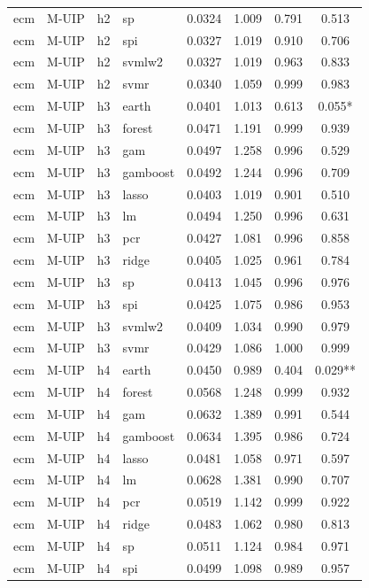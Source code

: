 \begin{ThreePartTable}
\begin{longtable}[t]{llclcccc}
ecm & M-UIP & h2 & sp & 0.0324 & 1.009 & 0.791 & 0.513\\
ecm & M-UIP & h2 & spi & 0.0327 & 1.019 & 0.910 & 0.706\\
ecm & M-UIP & h2 & svmlw2 & 0.0327 & 1.019 & 0.963 & 0.833\\
ecm & M-UIP & h2 & svmr & 0.0340 & 1.059 & 0.999 & 0.983\\
\addlinespace
ecm & M-UIP & h3 & earth & 0.0401 & 1.013 & 0.613 & 0.055*\\
ecm & M-UIP & h3 & forest & 0.0471 & 1.191 & 0.999 & 0.939\\
ecm & M-UIP & h3 & gam & 0.0497 & 1.258 & 0.996 & 0.529\\
ecm & M-UIP & h3 & gamboost & 0.0492 & 1.244 & 0.996 & 0.709\\
ecm & M-UIP & h3 & lasso & 0.0403 & 1.019 & 0.901 & 0.510\\
ecm & M-UIP & h3 & lm & 0.0494 & 1.250 & 0.996 & 0.631\\
ecm & M-UIP & h3 & pcr & 0.0427 & 1.081 & 0.996 & 0.858\\
ecm & M-UIP & h3 & ridge & 0.0405 & 1.025 & 0.961 & 0.784\\
ecm & M-UIP & h3 & sp & 0.0413 & 1.045 & 0.996 & 0.976\\
ecm & M-UIP & h3 & spi & 0.0425 & 1.075 & 0.986 & 0.953\\
ecm & M-UIP & h3 & svmlw2 & 0.0409 & 1.034 & 0.990 & 0.979\\
ecm & M-UIP & h3 & svmr & 0.0429 & 1.086 & 1.000 & 0.999\\
\addlinespace
ecm & M-UIP & h4 & earth & 0.0450 & 0.989 & 0.404 & 0.029**\\
ecm & M-UIP & h4 & forest & 0.0568 & 1.248 & 0.999 & 0.932\\
ecm & M-UIP & h4 & gam & 0.0632 & 1.389 & 0.991 & 0.544\\
ecm & M-UIP & h4 & gamboost & 0.0634 & 1.395 & 0.986 & 0.724\\
ecm & M-UIP & h4 & lasso & 0.0481 & 1.058 & 0.971 & 0.597\\
ecm & M-UIP & h4 & lm & 0.0628 & 1.381 & 0.990 & 0.707\\
ecm & M-UIP & h4 & pcr & 0.0519 & 1.142 & 0.999 & 0.922\\
ecm & M-UIP & h4 & ridge & 0.0483 & 1.062 & 0.980 & 0.813\\
ecm & M-UIP & h4 & sp & 0.0511 & 1.124 & 0.984 & 0.971\\
ecm & M-UIP & h4 & spi & 0.0499 & 1.098 & 0.989 & 0.957\\

\end{longtable}
\end{ThreePartTable}
